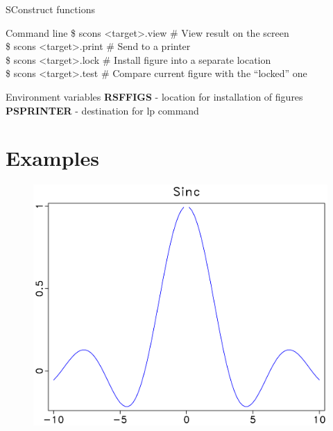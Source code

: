 \begin{frame}
  \begin{block}{SConstruct functions}
   
  \end{block}
  \begin{block}{Command line}
   \$ scons \textless target\textgreater.view \# View result on the screen \\
   \$ scons \textless target\textgreater.print \# Send to a printer \\
   \$ scons \textless target\textgreater.lock \# Install figure into a separate location \\
   \$ scons \textless target\textgreater.test \# Compare current figure with the ``locked'' one
  \end{block}
  \begin{block}{Environment variables}
   {\bf RSFFIGS} - location for installation of figures \\
   {\bf PSPRINTER} - destination for lp command
  \end{block}
\end{frame}

\section{Examples}

\begin{frame}
  \begin{figure}
  \includegraphics[scale=0.25]{plot/Fig/sinc.pdf}
  \end{figure}
\end{frame}


